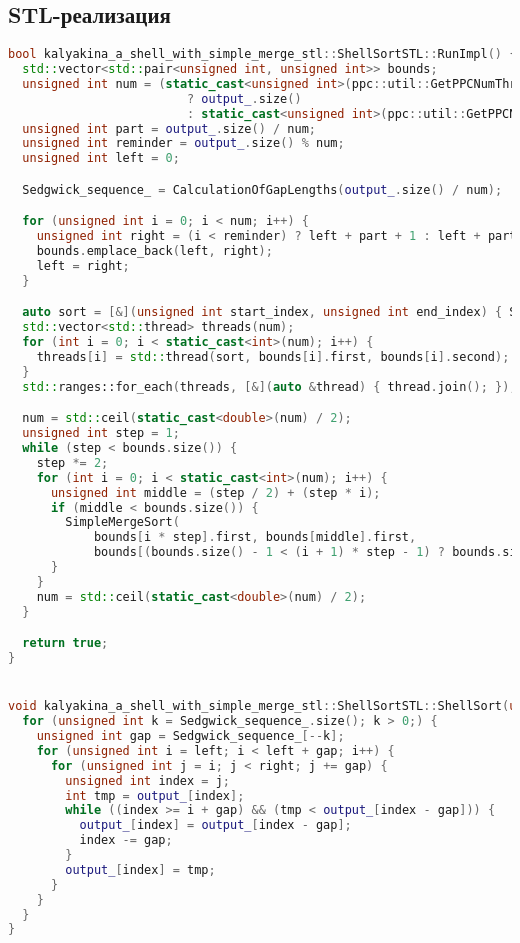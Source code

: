 \documentclass[a4paper,14pt]{extarticle}
\begin{document}
\subsection*{STL-реализация}

\begin{lstlisting}[language=C++]
bool kalyakina_a_shell_with_simple_merge_stl::ShellSortSTL::RunImpl() {
  std::vector<std::pair<unsigned int, unsigned int>> bounds;
  unsigned int num = (static_cast<unsigned int>(ppc::util::GetPPCNumThreads()) > output_.size())
                         ? output_.size()
                         : static_cast<unsigned int>(ppc::util::GetPPCNumThreads());
  unsigned int part = output_.size() / num;
  unsigned int reminder = output_.size() % num;
  unsigned int left = 0;

  Sedgwick_sequence_ = CalculationOfGapLengths(output_.size() / num);

  for (unsigned int i = 0; i < num; i++) {
    unsigned int right = (i < reminder) ? left + part + 1 : left + part;
    bounds.emplace_back(left, right);
    left = right;
  }

  auto sort = [&](unsigned int start_index, unsigned int end_index) { ShellSort(start_index, end_index); };
  std::vector<std::thread> threads(num);
  for (int i = 0; i < static_cast<int>(num); i++) {
    threads[i] = std::thread(sort, bounds[i].first, bounds[i].second);
  }
  std::ranges::for_each(threads, [&](auto &thread) { thread.join(); });

  num = std::ceil(static_cast<double>(num) / 2);
  unsigned int step = 1;
  while (step < bounds.size()) {
    step *= 2;
    for (int i = 0; i < static_cast<int>(num); i++) {
      unsigned int middle = (step / 2) + (step * i);
      if (middle < bounds.size()) {
        SimpleMergeSort(
            bounds[i * step].first, bounds[middle].first,
            bounds[(bounds.size() - 1 < (i + 1) * step - 1) ? bounds.size() - 1 : ((i + 1) * step) - 1].second);
      }
    }
    num = std::ceil(static_cast<double>(num) / 2);
  }

  return true;
}


void kalyakina_a_shell_with_simple_merge_stl::ShellSortSTL::ShellSort(unsigned int left, unsigned int right) {
  for (unsigned int k = Sedgwick_sequence_.size(); k > 0;) {
    unsigned int gap = Sedgwick_sequence_[--k];
    for (unsigned int i = left; i < left + gap; i++) {
      for (unsigned int j = i; j < right; j += gap) {
        unsigned int index = j;
        int tmp = output_[index];
        while ((index >= i + gap) && (tmp < output_[index - gap])) {
          output_[index] = output_[index - gap];
          index -= gap;
        }
        output_[index] = tmp;
      }
    }
  }
}
\end{lstlisting}
\end{document}
